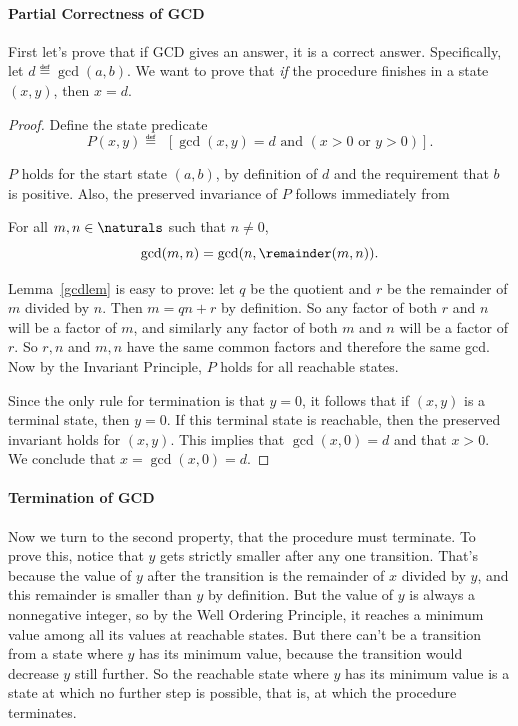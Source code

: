 \paragraph{Partial Correctness of GCD}

First let's prove that if GCD gives an answer, it is a correct answer.
Specifically, let $d \eqdef \gcd(a,b)$.  We want to prove that \emph{if}
the procedure finishes in a state $(x,y)$, then $x = d$.

\begin{proof}
Define the state predicate
\[
P(x,y) \eqdef\ \ [\gcd(x,y) = d \text{ and } (x > 0 \text{ or } y > 0)].
\]

$P$ holds for the start state $(a,b)$, by definition of $d$ and the
requirement that $b$ is positive.  Also, the preserved invariance of
$P$ follows immediately from
\begin{lemma}\label{gcdlem}
For all $m,n \in \naturals$ such that $n \neq 0$,
\begin{equation}
\gcd(m,n) = \gcd(n,\remainder(m,n)).
\end{equation}
\end{lemma}

Lemma~\ref{gcdlem} is easy to prove: let $q$ be the quotient and $r$ be
the remainder of $m$ divided by $n$.  Then $m = qn +r$ by definition.  So
any factor of both $r$ and $n$ will be a factor of $m$, and similarly any
factor of both $m$ and $n$ will be a factor of $r$.  So $r,n$ and $m,n$
have the same common factors and therefore the same gcd.  Now by
the Invariant Principle, $P$ holds for all reachable states.

Since the only rule for termination is that $y=0$, it follows that if
$(x,y)$ is a terminal state, then $y=0$.  If this terminal state is
reachable, then the preserved invariant holds for $(x,y)$.  This implies
that $\gcd(x,0) = d$ and that $x>0$.  We conclude that $x = \gcd(x,0) =
d$.
\end{proof}

\paragraph{Termination of GCD}

Now we turn to the second property, that the procedure must terminate.  To
prove this, notice that $y$ gets strictly smaller after any one
transition.  That's because the value of $y$ after the transition is the
remainder of $x$ divided by $y$, and this remainder is smaller than $y$ by
definition.  But the value of $y$ is always a nonnegative integer, so by the
Well Ordering Principle, it reaches a minimum value among all its values
at reachable states.  But there can't be a transition from a state where
$y$ has its minimum value, because the transition would decrease $y$ still
further.  So the reachable state where $y$ has its minimum value is a
state at which no further step is possible, that is, at which the
procedure terminates.

